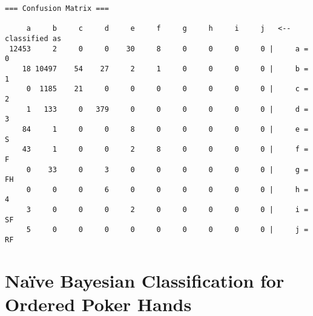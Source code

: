 \documentclass[10pt, a4paper]{article}
\begin{document}
\begin{verbatim}
=== Confusion Matrix ===

     a     b     c     d     e     f     g     h     i     j   <-- classified as
 12453     2     0     0    30     8     0     0     0     0 |     a = 0
    18 10497    54    27     2     1     0     0     0     0 |     b = 1
     0  1185    21     0     0     0     0     0     0     0 |     c = 2
     1   133     0   379     0     0     0     0     0     0 |     d = 3
    84     1     0     0     8     0     0     0     0     0 |     e = S
    43     1     0     0     2     8     0     0     0     0 |     f = F
     0    33     0     3     0     0     0     0     0     0 |     g = FH
     0     0     0     6     0     0     0     0     0     0 |     h = 4
     3     0     0     0     2     0     0     0     0     0 |     i = SF
     5     0     0     0     0     0     0     0     0     0 |     j = RF
\end{verbatim}

\label{app:confusion}

\clearpage

\section{Na\"ive Bayesian Classification for Ordered Poker Hands}
\label{app:naive}
\end{document}
